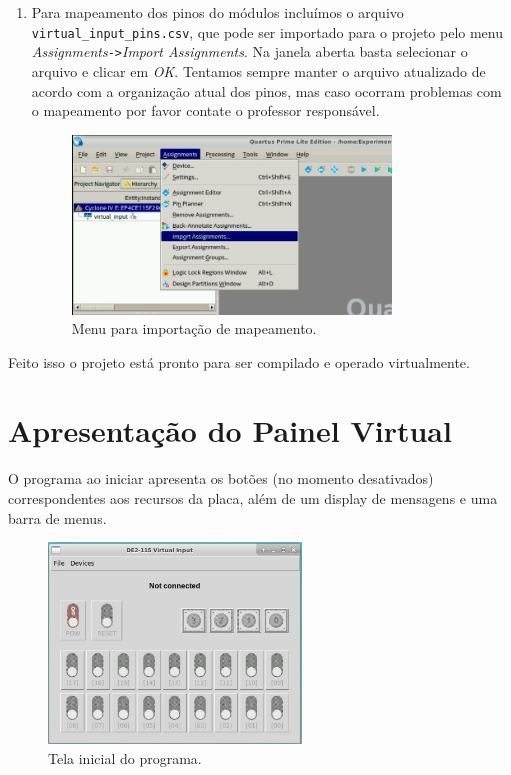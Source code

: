 \documentclass[12pt]{article}
\begin{document}
\begin{enumerate}[font=\bfseries]
    \item Para mapeamento dos pinos do módulos incluímos o arquivo \verb|virtual_input_pins.csv|, que pode ser importado para o projeto pelo menu \textit{Assignments}\verb|->|\textit{Import Assignments}. Na janela aberta basta selecionar o arquivo e clicar em \textit{OK}. Tentamos sempre manter o arquivo atualizado de acordo com a organização atual dos pinos, mas caso ocorram problemas com o mapeamento por favor contate o professor responsável.
    
    \begin{figure}[H]
    \centering
    \includegraphics[width=0.8\textwidth]{img/pins-quartus.jpg}
    \caption{\label{ref:pins-quartus}Menu para importação de mapeamento.}
    \end{figure}
    
\end{enumerate}
Feito isso o projeto está pronto para ser compilado e operado virtualmente.

\section{Apresentação do Painel Virtual}
O programa ao iniciar apresenta os botões (no momento desativados) correspondentes aos recursos da placa, além de um display de mensagens e uma barra de menus.

\begin{figure}[H]
    \centering
    \includegraphics[width=0.6\textwidth]{img/de2-initial.jpg}
    \caption{\label{ref:fig1}Tela inicial do programa.}
\end{figure}
\end{document}

